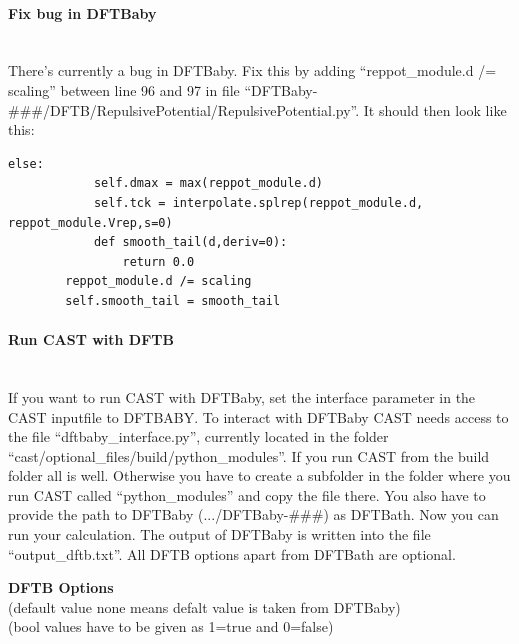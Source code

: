 \documentclass[10pt,a4paper]{article} %
\begin{document}
\paragraph{Fix bug in DFTBaby}\mbox{}\\

There's currently a bug in DFTBaby. Fix this by adding ``reppot\_module.d /= scaling'' between line 96 and 97 in file ``DFTBaby-\#\#\#/DFTB/RepulsivePotential/RepulsivePotential.py''. It should then look like this:
\begin{lstlisting}[firstnumber=92]
        else:
            self.dmax = max(reppot_module.d)
            self.tck = interpolate.splrep(reppot_module.d, reppot_module.Vrep,s=0)
            def smooth_tail(d,deriv=0):
                return 0.0
        reppot_module.d /= scaling
        self.smooth_tail = smooth_tail
\end{lstlisting}

\paragraph{Run CAST with DFTB}\mbox{}\\

If you want to run CAST with DFTBaby, set the interface parameter in the CAST inputfile to DFTBABY. To interact with DFTBaby CAST needs access to the file ``dftbaby\_interface.py'', currently located in the folder ``cast/optional\_files/build/python\_modules''. If you run CAST from the build folder all is well. Otherwise you have to create a subfolder in the folder where you run CAST called ``python\_modules'' and copy the file there. You also have to provide the path to DFTBaby (.../DFTBaby-\#\#\#) as DFTBath. Now you can run your calculation. The output of DFTBaby is written into the file ``output\_dftb.txt''. All DFTB options apart from DFTBath are optional. 


\textbf{DFTB Options} 
\\(default value none means defalt value is taken from DFTBaby)
\\(bool values have to be given as 1=true and 0=false)
\end{document}
